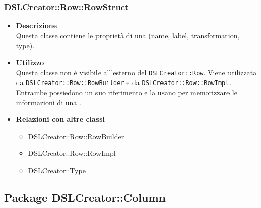  \subsubsection{DSLCreator::Row::RowStruct}
                    \begin{itemize}
                        \item \textbf{Descrizione} \hfill \\
                          Questa classe contiene le proprietà di una  (name, label, transformation, type).
                        \item \textbf{Utilizzo} \hfill \\
                          Questa classe non è visibile all'esterno del  \texttt{DSLCreator::Row}. Viene utilizzata da \texttt{DSLCreator::Row::RowBuilder} e da \texttt{DSLCreator::Row::RowImpl}. Entrambe possiedono un suo riferimento e la usano per memorizzare le informazioni di una .
                        \item \textbf{Relazioni con altre classi}
                            \begin{itemize}
                              \item DSLCreator::Row::RowBuilder
                              \item DSLCreator::Row::RowImpl
                              \item DSLCreator::Type
                            \end{itemize}
                    \end{itemize}  

\subsection{Package DSLCreator::Column}
